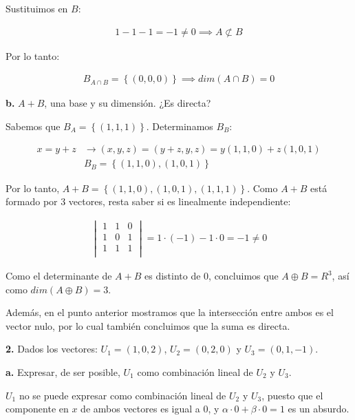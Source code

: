 \documentclass[12pt]{article}
\begin{document}
Sustituimos en \(B\):

\begin{align*}
  1 - 1 - 1 = -1 \neq 0 \implies A \not \subset B
\end{align*}

Por lo tanto:

\begin{align*}
  B_{A \cap B} = \left\{(0,0,0)\right\} \implies dim(A \cap B) = 0
\end{align*}

\hspace{6mm}\textbf{b.}
\(A + B\), una base y su dimensión. ¿Es directa?

Sabemos que \(B_{A} = \left\{(1,1,1)\right\}\).
Determinamos \(B_{B}\):

\begin{align*}
  x = y + z & \rightarrow (x,y,z) = (y+z,y,z) = y(1,1,0) + z(1,0,1) \\
            & \boxed{B_{B} = \left\{(1,1,0),(1,0,1)\right\}}
\end{align*}

Por lo tanto, \(A + B = \left\{(1,1,0),(1,0,1),(1,1,1)\right\}\).
Como \(A + B\) está formado por 3 vectores, resta saber si es linealmente
independiente:

\begin{align*}
  \begin{vmatrix}
    1 & 1 & 0 \\
    1 & 0 & 1 \\
    1 & 1 & 1 \\
  \end{vmatrix} = 1 \cdot (-1) - 1 \cdot 0 = \boxed{-1 \neq 0}
\end{align*}

Como el determinante de \(A + B\) es distinto de 0,
concluimos que \(A \oplus B = R^{3}\), así como \(dim(A\oplus B) = 3\).

Además, en el punto anterior mostramos que la intersección entre ambos
es el vector nulo, por lo cual también concluimos que la suma es directa.

\textbf{2.}
Dados los vectores:
\(U_{1} = (1,0,2)\),
\(U_{2} = (0,2,0)\) y
\(U_{3} = (0,1,-1)\).

\hspace{6mm}\textbf{a.}
Expresar, de ser posible, \(U_{1}\) como combinación lineal de \(U_{2}\) y
\(U_{3}\).

\(U_{1}\) no se puede expresar como combinación lineal de \(U_{2}\) y
\(U_{3}\), puesto que el componente en \(x\) de ambos vectores es igual a 0,
y \(\alpha\cdot 0 + \beta\cdot 0 = 1\) es un absurdo.
\end{document}
